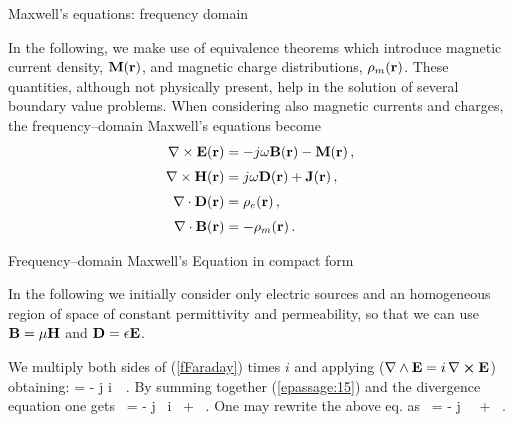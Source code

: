 \documentclass[handout,10pt]{beamer}
\begin{document}
\begin{frame}[fragile]{Maxwell's equations: frequency domain}

In the following, we make use of equivalence theorems which introduce
magnetic current density,
${\mathbf{M}}({\mathbf{r}})$, and magnetic charge distributions,
$\rho_{m}({\mathbf{r}})$. These quantities, although not
physically present, help in the solution of several boundary
value problems. When considering also magnetic
currents and charges, the frequency--domain Maxwell's equations become
%
\begin{subequations}
\begin{align}
 \nabla \times {\mathbf{E}}({\mathbf{r}})  & =    - j\omega {\mathbf{B}}({\mathbf{r}})
- {\mathbf{M}}({\mathbf{r}})\,,
  \label{fFaraday}
\\[1mm]
 \nabla \times {\mathbf{H}}({\mathbf{r}})  & =     j\omega {\mathbf{D}}({\mathbf{r}})
+ {\mathbf{J}}({\mathbf{r}})\,,
  \label{fAmpere}
\\[1mm]
  \nabla \cdot {\mathbf{D}}({\mathbf{r}})  & =     \rho_e({\mathbf{r}})\,,
  \label{fGausse}
\\[1mm]
  \nabla \cdot {\mathbf{B}}({\mathbf{r}})  & =   - \rho_{m}({\mathbf{r}})\,.
  \label{fGaussm}
\end{align}
\end{subequations}

\end{frame}




\begin{frame}[fragile]{Frequency--domain Maxwell's Equation in compact form}

 In the following we initially consider only electric sources and an homogeneous region of space of constant  permittivity and permeability, so that we can use $\mathbf{B} = \mu \mathbf{H}$ and $\mathbf{D} = \epsilon \mathbf{E}$.
 
We multiply both sides of  (\ref{fFaraday}) times $i$ and applying ($\nabla \wedge \mathbf{E}  =  i \, \nabla \cross \mathbf{E}$) obtaining:
\be
\nabla \wedge \BE = - j \omega \mu   i  \,\BH \, . \label{epassage:15}
\ee
By summing together (\ref{epassage:15}) and the divergence equation one gets
\be
\nabla \,  \BE = - j \omega \mu  \,  i  \,\BH  
+ \frac{\rho}{\epsilon} \label{epassage:25} \, .
\ee
One may rewrite the above eq. as
\be
\nabla \,  \BE = - j \omega \mu  \,   \,\hat{\BH}  
+ \frac{\rho}{\epsilon} \label{epassage:27} \, .
\ee



\end{frame}
\end{document}

